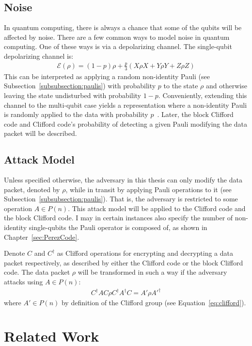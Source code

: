 \section{Noise}
\label{subsec:noise}
In quantum computing, there is always a chance that some of the qubits will be affected by noise. There are a few common ways to model noise in quantum computing. One of these ways is via a depolarizing channel. The single-qubit depolarizing channel is:
\begin{align}
\mathcal{E}(\rho)=(1-p) \rho+\frac{p}{3}(X \rho X+Y \rho Y+Z \rho Z)
\end{align}
This can be interpreted as applying a random non-identity Pauli (see Subsection~\ref{subsubsection:paulis}) with probability $p$ to the state $\rho$ and otherwise leaving the state undisturbed with probability $1-p$. Conveniently, extending this channel to the multi-qubit case yields a representation where a non-identity Pauli is randomly applied to the data with probability $p$~\cite{qiskitDepolarizingChannel}. Later, the block Clifford code and Clifford code's probability of detecting a given Pauli modifying the data packet will be described.

\section{Attack Model}
\label{section:attackModel}
Unless specified otherwise, the adversary in this thesis can only modify the data packet, denoted by $\rho$, while in transit by applying Pauli operations to it (see Subsection~\ref{subsubsection:paulis}). That is, the adversary is restricted to some operation $A \in P(n)$. This attack model will be applied to the Clifford code and the block Clifford code. I may in certain instances also specify the number of non-identity single-qubits the Pauli operator is composed of, as shown in Chapter~\ref{sec:PerezCode}. 

Denote $C$ and $C^{\dagger}$ as Clifford operations for encrypting and decrypting a data packet respectively, as described by either the Clifford code or the block Clifford code. The data packet $\rho$ will be transformed in such a way if the adversary attacks using $A \in P(n)$: 
\begin{align}
C^{\dagger}AC \rho C^{\dagger}A^{\dagger}C = A' \rho A'^{\dagger}
\end{align}
where $A' \in P(n)$ by definition of the Clifford group (see Equation~\eqref{eq:clifford}).

\chapter{Related Work}
\label{sec:relatedWork}
